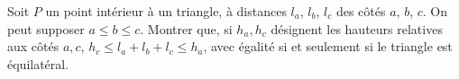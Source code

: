 Soit $P$ un point intérieur à un triangle, à distances $l_a$, $l_b$, $l_c$ des côtés $a$, $b$, $c$. On peut supposer $a \leq b \leq c$. Montrer que, si $h_a, h_c$ désignent les hauteurs relatives aux côtés $a, c$, $h_c \leq l_a + l_b + l_c \leq h_a$, avec égalité si et seulement si le triangle est équilatéral.
